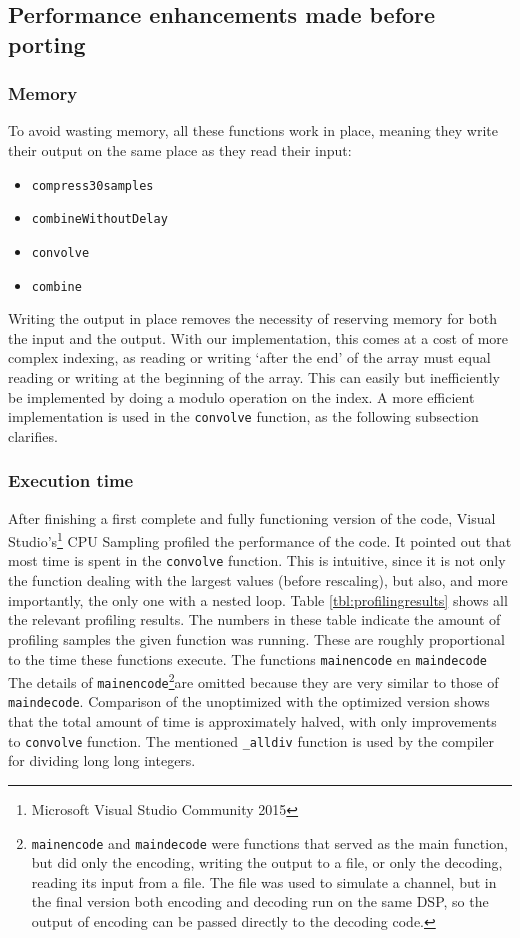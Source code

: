 \documentclass[a4paper]{article}
\begin{document}
\subsection{Performance enhancements made before porting}\label{sec:performance}
\subsubsection{Memory}
To avoid wasting memory, all these functions work in place, meaning they write their output on the same place as they read their input:
\begin{itemize}[noitemsep]
\item \texttt{compress30samples}
\item \texttt{combineWithoutDelay}
\item \texttt{convolve}
\item \texttt{combine}
\end{itemize}
Writing the output in place removes the necessity of reserving memory for both the input and the output. With our implementation, this comes at a cost of more complex indexing, as reading or writing `after the end' of the array must equal reading or writing at the beginning of the array. This can easily but inefficiently be implemented by doing a modulo operation on the index. A more efficient implementation is used in the \texttt{convolve} function, as the following subsection clarifies.
\subsubsection{Execution time}\label{sec:processing}
After finishing a first complete and fully functioning version of the code, Visual Studio's\footnote{Microsoft Visual Studio Community 2015} CPU Sampling profiled the performance of the code. It pointed out that most time is spent in the \texttt{convolve} function. This is intuitive, since it is not only the function dealing with the largest values (before rescaling), but also, and more importantly, the only one with a nested loop. Table \ref{tbl:profilingresults} shows all the relevant profiling results. The numbers in these table indicate the amount of profiling samples the given function was running. These are roughly proportional to the time these functions execute. The functions \texttt{mainencode} en \texttt{maindecode} The details of \texttt{mainencode}\footnote{\texttt{mainencode} and \texttt{maindecode} were functions that served as the main function, but did only the encoding, writing the output to a file, or only the decoding, reading its input from a file. The file was used to simulate a channel, but in the final version both encoding and decoding run on the same DSP, so the output of encoding can be passed directly to the decoding code.}are omitted because they are very similar to those of \texttt{maindecode}. Comparison of the unoptimized with the optimized version shows that the total amount of time is approximately halved, with only improvements to \texttt{convolve} function. The mentioned \texttt{\_alldiv} function is used by the compiler for dividing long long integers.\\
\end{document}
